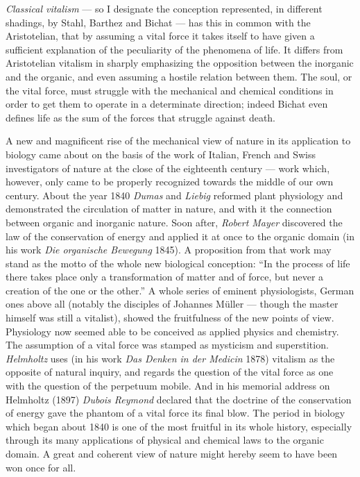 \documentclass[12pt,a4paper]{article}
\begin{document}
\emph{Classical vitalism} --- so I designate the conception represented, in
different shadings, by Stahl, Barthez and Bichat --- has this in common with the
Aristotelian, that by assuming a vital force it takes itself to have given a
sufficient explanation of the peculiarity of the phenomena of life. It differs
from Aristotelian vitalism in sharply emphasizing the opposition between the
inorganic and the organic, and even assuming a hostile relation
between them. The soul, or the vital force, must struggle with the mechanical
and chemical conditions in order to get them to operate in a determinate
direction; indeed Bichat even defines life as the sum of the forces that
struggle against death.

A new and magnificent rise of the mechanical view of nature in its application
to biology came about on the basis of the work of Italian, French and Swiss
investigators of nature at the close of the eighteenth century --- work which,
however, only came to be properly recognized towards the middle of our own
century. About the year 1840 \emph{Dumas} and \emph{Liebig} reformed plant
physiology and demonstrated the circulation of matter in nature, and with it the
connection between organic and inorganic nature. Soon after, \emph{Robert Mayer}
discovered the law of the conservation of energy and applied it at once to the
organic domain (in his work \textit{Die organische Bewegung} 1845). A
proposition from that work may stand as the motto of the whole new biological
conception: ``In the process of life there takes place only a transformation of
matter and of force, but never a creation of the one or the other.'' A whole
series of eminent physiologists, German ones above all (notably the disciples of
Johannes Müller --- though the master himself was still a vitalist), showed the
fruitfulness of the new points of view. Physiology now seemed able to be
conceived as applied physics and chemistry. The assumption of a vital force was
stamped as mysticism and superstition. \emph{Helmholtz} uses (in his work
\textit{Das Denken in der Medicin} 1878) vitalism as the opposite of natural
inquiry, and regards the question of the vital force as one with the question of
the perpetuum mobile. And in his memorial address on Helmholtz (1897)
\emph{Dubois Reymond} declared that the doctrine of the conservation of energy
gave the phantom of a vital force its final blow. The period in biology which
began about 1840 is one of the most fruitful in its whole history, especially
through its many applications of physical and chemical laws to the organic
domain. A great and coherent view of nature might hereby seem to have been won
once for all.
\end{document}

